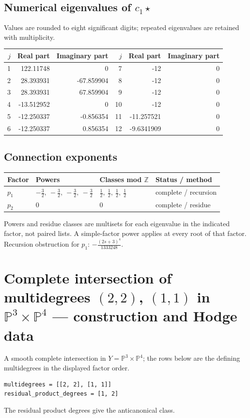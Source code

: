 \documentclass[10pt,a4paper]{article}
\begin{document}
\subsection*{Numerical eigenvalues of $c_1\star$}
Values are rounded to eight significant digits; repeated eigenvalues are retained with multiplicity.
\begin{center}\small\begin{tabular}{rrr@{\qquad}rrr}\toprule $j$ & Real part & Imaginary part & $j$ & Real part & Imaginary part\\\midrule
1 & 122.11748 & 0 & 7 & -12 & 0\\
2 & 28.393931 & -67.859904 & 8 & -12 & 0\\
3 & 28.393931 & 67.859904 & 9 & -12 & 0\\
4 & -13.512952 & 0 & 10 & -12 & 0\\
5 & -12.250337 & -0.856354 & 11 & -11.257521 & 0\\
6 & -12.250337 & 0.856354 & 12 & -9.6341909 & 0\\
\bottomrule\end{tabular}\end{center}
\subsection*{Connection exponents}
\begin{center}\begin{tabular}{llll}\toprule Factor & Powers & Classes mod $\mathbb Z$ & Status / method\\\midrule
$p_{1}$ & $- \frac{3}{2},\ - \frac{3}{2},\ - \frac{3}{2},\ - \frac{3}{2}$ & $\frac{1}{2},\ \frac{1}{2},\ \frac{1}{2},\ \frac{1}{2}$ & complete / recursion\\
$p_{2}$ & $0$ & $0$ & complete / residue\\
\bottomrule\end{tabular}\end{center}
Powers and residue classes are multisets for each eigenvalue in the indicated factor, not paired lists. A simple-factor power applies at every root of that factor.
Recursion obstruction for $p_{1}$: $- \frac{\left(2 s + 3\right)^{4}}{1333248}$.
\clearpage\section*{Complete intersection of multidegrees $(2,2)$, $(1,1)$ in $\mathbb P^{3}\times \mathbb P^{4}$ --- construction and Hodge data}\label{entry:PROD5-D01}
A smooth complete intersection in $Y=\mathbb P^{3}\times\mathbb P^{4}$; the rows below are the defining multidegrees in the displayed factor order.
\begin{lstlisting}
multidegrees = [[2, 2], [1, 1]]
residual_product_degrees = [1, 2]
\end{lstlisting}
The residual product degrees give the anticanonical class.
\end{document}
